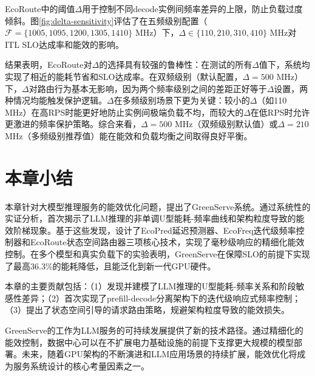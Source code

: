 EcoRoute中的阈值$\Delta$用于控制不同decode实例间频率差异的上限，防止负载过度倾斜。图\ref{fig:delta-sensitivity}评估了在五频级别配置（$\mathcal{F}=\{1005, 1095, 1200, 1305, 1410\}$ MHz）下，$\Delta \in \{110, 210, 310, 410\}$ MHz对ITL SLO达成率和能效的影响。

结果表明，EcoRoute对$\Delta$的选择具有较强的鲁棒性：在测试的所有$\Delta$值下，系统均实现了相近的能耗节省和SLO达成率。在双频级别（默认配置，$\Delta=500$ MHz）下，$\Delta$对路由行为基本无影响，因为两个频率级别之间的差距正好等于$\Delta$设置，两种情况均能触发保护逻辑。$\Delta$在多频级别场景下更为关键：较小的$\Delta$（如110 MHz）在高RPS时能更好地防止实例间极端负载不均，而较大的$\Delta$在低RPS时允许更激进的频率保护策略。综合来看，$\Delta=500$ MHz（双频级别默认值）或$\Delta=210$ MHz（多频级别推荐值）能在能效和负载均衡之间取得良好平衡。

\section{本章小结}

本章针对大模型推理服务的能效优化问题，提出了GreenServe系统。通过系统性的实证分析，首次揭示了LLM推理的非单调U型能耗-频率曲线和架构粒度导致的能效阶梯现象。基于这些发现，设计了EcoPred延迟预测器、EcoFreq迭代级频率控制器和EcoRoute状态空间路由器三项核心技术，实现了毫秒级响应的精细化能效控制。在多个模型和真实负载下的实验表明，GreenServe在保障SLO的前提下实现了最高36.3\%的能耗降低，且能泛化到新一代GPU硬件。

本章的主要贡献包括：（1）发现并建模了LLM推理的U型能耗-频率关系和阶段敏感性差异；（2）首次实现了prefill-decode分离架构下的迭代级响应式频率控制；（3）提出了状态空间引导的请求路由策略，规避架构粒度导致的能效损失。

GreenServe的工作为LLM服务的可持续发展提供了新的技术路径。通过精细化的能效控制，数据中心可以在不扩展电力基础设施的前提下支撑更大规模的模型部署。未来，随着GPU架构的不断演进和LLM应用场景的持续扩展，能效优化将成为服务系统设计的核心考量因素之一。
